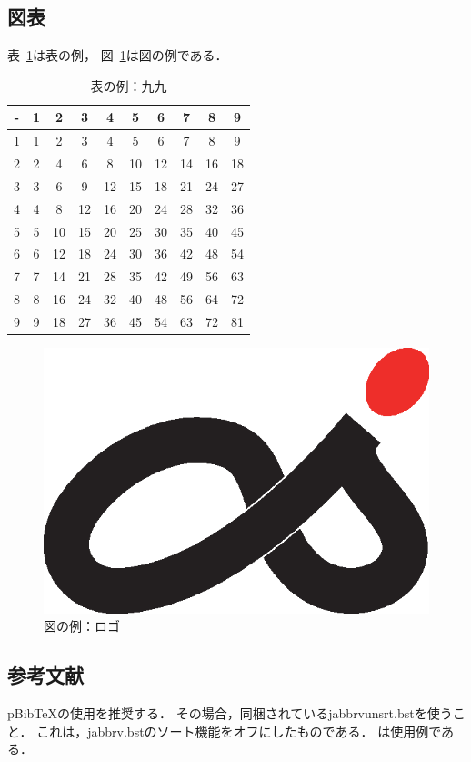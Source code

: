 \documentclass[a4paper,twoside,twocolumn,10pt]{article}
\begin{document}
\subsection{図表}
表~\ref{tbl:kuku}は表の例，
図~\ref{fig:CSIS_logo}は図の例である．

\begin{table}[tb]
  \caption{表の例：九九}
  \label{tbl:kuku}
  \centering
  \begin{tabular}{|c||c|c|c|c|c|c|c|c|c|} \hline
    - &  1 &  2 &  3 &  4 &  5 &  6 &  7 &  8 &  9 \\ \hline \hline
    1 &  1 &  2 &  3 &  4 &  5 &  6 &  7 &  8 &  9 \\ \hline
    2 &  2 &  4 &  6 &  8 & 10 & 12 & 14 & 16 & 18 \\ \hline
    3 &  3 &  6 &  9 & 12 & 15 & 18 & 21 & 24 & 27 \\ \hline
    4 &  4 &  8 & 12 & 16 & 20 & 24 & 28 & 32 & 36 \\ \hline
    5 &  5 & 10 & 15 & 20 & 25 & 30 & 35 & 40 & 45 \\ \hline
    6 &  6 & 12 & 18 & 24 & 30 & 36 & 42 & 48 & 54 \\ \hline
    7 &  7 & 14 & 21 & 28 & 35 & 42 & 49 & 56 & 63 \\ \hline
    8 &  8 & 16 & 24 & 32 & 40 & 48 & 56 & 64 & 72 \\ \hline
    9 &  9 & 18 & 27 & 36 & 45 & 54 & 63 & 72 & 81 \\ \hline
  \end{tabular}
\end{table}

\begin{figure}[tb]
  \centering
  \includegraphics[width=.3\hsize]{CSIS.eps}
  \caption{図の例：ロゴ}
  \label{fig:CSIS_logo}
\end{figure}

\subsection{参考文献}
pBibTeXの使用を推奨する．
その場合，同梱されているjabbrvunsrt.bstを使うこと．
これは，jabbrv.bstのソート機能をオフにしたものである．
\cite{SakaiMe, Food, Neko}は使用例である．
\end{document}
